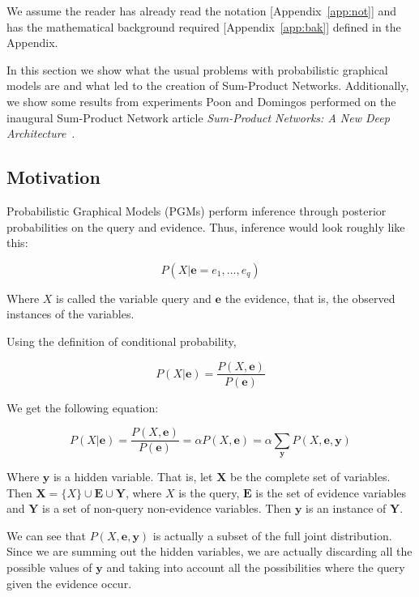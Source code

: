 \documentclass[a4paper,10pt]{article}
\theoremstyle{plain}
\begin{document}
We assume the reader has already read the notation [Appendix~\ref{app:not}] and has the
mathematical background required [Appendix~\ref{app:bak}] defined in the Appendix.

In this section we show what the usual problems with probabilistic graphical models are and what
led to the creation of Sum-Product Networks. Additionally, we show some results from experiments
Poon and Domingos performed on the inaugural Sum-Product Network article \textit{Sum-Product
Networks: A New Deep Architecture}~\cite{poon-domingos}.

\subsection{Motivation}

Probabilistic Graphical Models (PGMs) perform inference through posterior probabilities on the
query and evidence. Thus, inference would look roughly like this:

\begin{equation*}
  P(X | \mathbf{e}=e_1,\ldots,e_q)
\end{equation*}

Where $X$ is called the variable query and $\mathbf{e}$ the evidence, that is, the observed
instances of the variables.

Using the definition of conditional probability,

\begin{equation*}
  P(X|\mathbf{e})=\frac{P(X,\mathbf{e})}{P(\mathbf{e})}
\end{equation*}

We get the following equation:

\begin{equation}
  P(X|\mathbf{e})=\frac{P(X,\mathbf{e})}{P(\mathbf{e})}=\alpha P(X,\mathbf{e})=\alpha
  \sum_{\mathbf{y}} P(X,\mathbf{e},\mathbf{y})
\end{equation}

Where $\mathbf{y}$ is a hidden variable. That is, let $\mathbf{X}$ be the complete set of
variables. Then $\mathbf{X}=\{X\} \cup \mathbf{E} \cup \mathbf{Y}$, where $X$ is the query,
$\mathbf{E}$ is the set of evidence variables and $\mathbf{Y}$ is a set of non-query non-evidence
variables. Then $\mathbf{y}$ is an instance of $\mathbf{Y}$.

We can see that $P(X,\mathbf{e},\mathbf{y})$ is actually a subset of the full joint distribution.
Since we are summing out the hidden variables, we are actually discarding all the possible values
of $\mathbf{y}$ and taking into account all the possibilities where the query given the evidence
occur.
\end{document}
